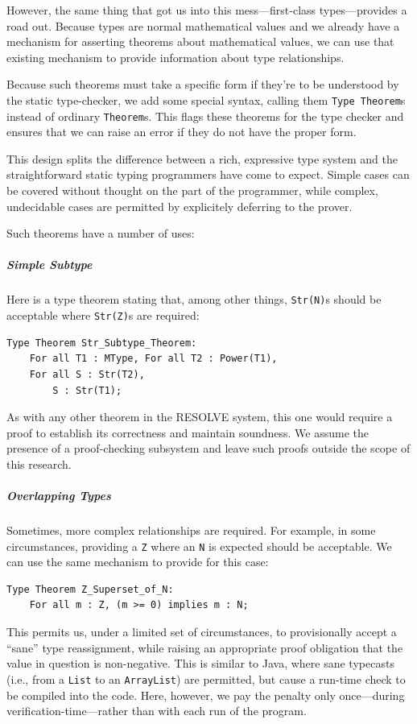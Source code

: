 However, the same thing that got us into this mess---first-class types---provides a road out.  Because types are normal mathematical values and we already have a mechanism for asserting theorems about mathematical values, we can use that existing mechanism to provide information about type relationships.

Because such theorems must take a specific form if they're to be understood by the static type-checker, we add some special syntax, calling them \texttt{Type Theorem}s instead of ordinary \texttt{Theorem}s.  This flags these theorems for the type checker and ensures that we can raise an error if they do not have the proper form.

This design splits the difference between a rich, expressive type system and the straightforward static typing programmers have come to expect.  Simple cases can be covered without thought on the part of the programmer, while complex, undecidable cases are permitted by explicitely deferring to the prover.

Such theorems have a number of uses:

\subparagraph{Simple Subtype}
Here is a type theorem stating that, among other things, \texttt{Str(N)}s should be acceptable where \texttt{Str(Z)}s are required:

\begin{lstlisting}
Type Theorem Str_Subtype_Theorem:
	For all T1 : MType, For all T2 : Power(T1),
	For all S : Str(T2),
		S : Str(T1);
\end{lstlisting}

As with any other theorem in the RESOLVE system, this one would require a proof to establish its correctness and maintain soundness.  We assume the presence of a proof-checking subsystem and leave such proofs outside the scope of this research.

\subparagraph{Overlapping Types}
Sometimes, more complex relationships are required.  For example, in some circumstances, providing a \texttt{Z} where an \texttt{N} is expected should be acceptable.  We can use the same mechanism to provide for this case:

\begin{lstlisting}
Type Theorem Z_Superset_of_N:
	For all m : Z, (m >= 0) implies m : N;
\end{lstlisting}

This permits us, under a limited set of circumstances, to provisionally accept a ``sane'' type reassignment, while raising an appropriate proof obligation that the value in question is non-negative.  This is similar to Java, where sane typecasts (i.e., from a \texttt{List} to an \texttt{ArrayList}) are permitted, but cause a run-time check to be compiled into the code.  Here, however, we pay the penalty only once---during verification-time---rather than with each run of the program.


